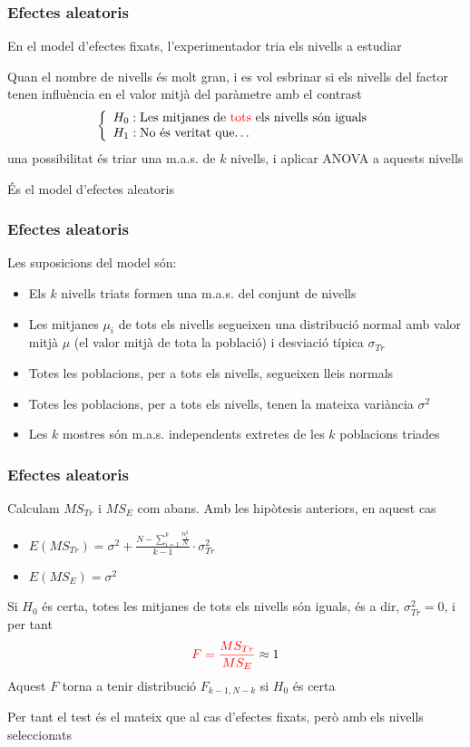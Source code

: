 \documentclass[12pt,t]{beamer}
\newcommand{\red}[1]{\textcolor{red}{#1}}
\renewcommand{\emph}[1]{{\color{red}#1}}
\theoremstyle{plain}
\theoremstyle{definition}
\begin{document}
\begin{frame}
\frametitle{Efectes aleatoris}

En el model d'efectes fixats, l'experimentador tria els nivells a estudiar
\medskip

Quan el nombre de nivells és molt gran, i es vol esbrinar si els nivells del factor tenen influència en el valor mitjà del paràmetre amb el contrast
$$
\left\{
\begin{array}{l}
H_0 : \mbox{Les mitjanes de \emph{tots} els nivells són iguals} \\
H_1 : \mbox{No és veritat que\ldots}
\end{array}
\right.
$$
una possibilitat és \emph{triar una m.a.s.} de $k$ nivells, i aplicar ANOVA a aquests nivells
\medskip

És el \emph{model d'efectes aleatoris}
\end{frame}

\begin{frame}
\frametitle{Efectes aleatoris}
Les suposicions del model són:

\begin{itemize}
\item Els $k$ nivells triats formen una m.a.s. del conjunt de nivells
\smallskip

\item Les mitjanes $\mu_i$ de tots els nivells segueixen una distribució normal amb valor mitjà $\mu$ (el valor mitjà de tota la població) i desviació típica $\sigma_{Tr}$
\smallskip


\item Totes les poblacions, per a tots els nivells, segueixen lleis normals
\smallskip


\item Totes les poblacions, per a tots els nivells, tenen la mateixa variància $\sigma^2$
\smallskip


\item Les $k$ mostres són m.a.s. independents
extretes de les $k$ poblacions triades
\end{itemize}
\end{frame}

\begin{frame}
\frametitle{Efectes aleatoris}

Calculam $MS_{Tr}$ i $MS_E$ com abans. Amb les hipòtesis anteriors, en aquest cas
\begin{itemize}
\item $E(MS_{Tr})=\displaystyle\sigma^2 + \frac{N-\sum_{i=1}^k \frac{n_i^2}{N}}{k-1}\cdot \sigma_{Tr}^2$
\medskip

\item $E(MS_E)=\sigma^2$
\end{itemize}
Si $H_0$ és certa, totes les mitjanes de tots els nivells són iguals, és a dir, $\sigma_{Tr}^2=0$, i per tant 
$$
\red{F=\frac{MS_{Tr}}{MS_E}}\approx 1
$$
Aquest $F$ torna a tenir distribució $F_{k-1,N-k}$ si $H_0$ és certa
\medskip

Per tant \emph{el test és el mateix que al cas d'efectes fixats}, però amb els nivells seleccionats
\end{frame}
\end{document}
